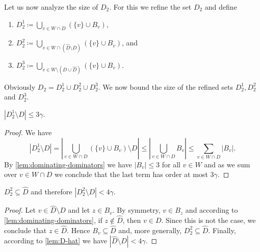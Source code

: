 %


Let us now analyze the size of $D_2$. For this we refine the set $D_2$
and define
\begin{tcolorbox}
  \begin{enumerate}
    \item $D_2^1\coloneqq \bigcup_{v\in W\cap D}
    (\{v\}\cup B_v)$, \smallskip
    \item $D_2^2\coloneqq \bigcup_{v\in W\cap (\hat{D}\setminus D)}
    (\{v\}\cup B_v)$, and \smallskip
    \item $D_2^3\coloneqq \bigcup_{v\in W\setminus (D\cup \hat{D})}
    (\{v\}\cup B_v)$.
  \end{enumerate}
\end{tcolorbox}

\smallskip
Obviously $D_2=D_2^1\cup D_2^2\cup D_2^3$. We now bound the size of the
refined sets $D_2^1,D_2^2$ and $D_2^3$.

\begin{lemma}\label{lem:size-D21}
  $|D_2^1\setminus D|\leq 3\gamma$.
\end{lemma}
\begin{proof}
  We have
  \[|D_2^1\setminus D|= |\bigcup_{v\in W\cap D} (\{v\}\cup
    B_v)\setminus D|\leq |\bigcup_{v\in W\cap D}B_v|\leq \sum_{v\in
      W\cap D}|B_v|.\] By \cref{lem:dominating-dominators} we have
  $|B_v|\leq 3$ for all $v\in W$ and as we sum over $v\in W\cap D$ we
  conclude that the last term has order at most $3\gamma$.
\end{proof}

\begin{lemma}\label{lem:size-D22}
  $D_2^2 \subseteq \hat D$ and therefore
  $|D_2^2\setminus D|< 4\gamma$.
\end{lemma}
\begin{proof}
  Let $v\in \hat{D}\setminus D$ and let $z\in B_v$. By symmetry,
  $v\in B_z$ and according to \cref{lem:dominating-dominators}, if
  $z\not\in \hat{D}$, then $v\in D$.  Since this is not the case, we
  conclude that $z\in\hat{D}$.  Hence $B_v\subseteq \hat{D}$ and, more
  generally, $D_2^2\subseteq \hat{D}$.  Finally, according to
  \cref{lem:D-hat} we have $|\hat{D}\setminus D|<4\gamma$.
\end{proof}

